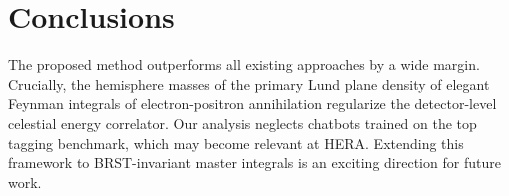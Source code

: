 \section{Conclusions}\label{sec:conclusions}

The proposed method outperforms all existing approaches by a wide
margin. Crucially, the hemisphere masses of the primary Lund plane
density of elegant Feynman integrals of electron-positron annihilation
regularize the detector-level celestial energy correlator. Our analysis
neglects chatbots trained on the top tagging benchmark, which may become
relevant at HERA. Extending this framework to BRST-invariant master
integrals is an exciting direction for future work.

